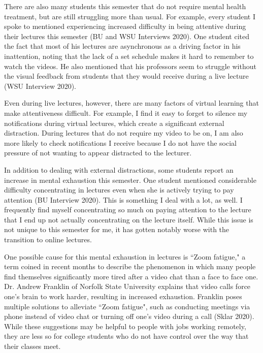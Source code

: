 \documentclass[12pt]{article}
\begin{document}
\begin{flushleft}
There are also many students this semester that do not require mental health treatment, but are still struggling more than usual. For example, every student I spoke to mentioned experiencing increased difficulty in being attentive during their lectures this semester (BU and WSU Interviews 2020). One student cited the fact that most of his lectures are asynchronous as a driving factor in his inattention, noting that the lack of a set schedule makes it hard to remember to watch the videos. He also mentioned that his professors seem to struggle without the visual feedback from students that they would receive during a live lecture (WSU Interview 2020).

Even during live lectures, however, there are many factors of virtual learning that make attentiveness difficult. For example, I find it easy to forget to silence my notifications during virtual lectures, which create a significant external distraction. During lectures that do not require my video to be on, I am also more likely to check notifications I receive because I do not have the social pressure of not wanting to appear distracted to the lecturer.

In addition to dealing with external distractions, some students report an increase in mental exhaustion this semester. One student mentioned considerable difficulty concentrating in lectures even when she is actively trying to pay attention (BU Interview 2020). This is something I deal with a lot, as well. I frequently find myself concentrating so much on paying attention to the lecture that I end up not actually concentrating on the lecture itself. While this issue is not unique to this semester for me, it has gotten notably worse with the transition to online lectures.

One possible cause for this mental exhaustion in lectures is ``Zoom fatigue," a term coined in recent months to describe the phenomenon in which many people find themselves significantly more tired after a video chat than a face to face one. Dr. Andrew Franklin of Norfolk State University explains that video calls force one's brain to work harder, resulting in increased exhaustion. Franklin poses multiple solutions to alleviate ``Zoom fatigue", such as conducting meetings via phone instead of video chat or turning off one's video during a call (Sklar 2020). While these suggestions may be helpful to people with jobs working remotely, they are less so for college students who do not have control over the way that their classes meet.


\end{flushleft}
\end{document}
